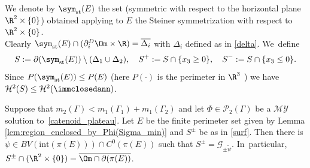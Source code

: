 We denote by $\sym_\mathrm{st}(E)$ the set (symmetric with respect to the horizontal plane $\R^2\times\{0\}$) obtained applying to $E$ the Steiner symmetrization with respect to $\R^2\times\{0\}$. \\
Clearly $\sym_\mathrm{st}(E)\cap(\partial_i^D\Om\times\R)=\overline{\Delta_i}$ with $\Delta_i$ defined as in \eqref{delta}. We~define
\begin{equation}\label{surf}
S:= \partial(\sym_\mathrm{st} (E))\setminus(\Delta_1\cup\Delta_2),\quad
S^+:= S\cap\{x_3\ge0\},\quad S^-:= S\cap\{x_3\le0\}.
\end{equation}
Since $P(\sym_\mathrm{st}(E))\le P(E)$ (here $P(\cdot)$ is the perimeter in $\R^3$ \cite{AFP}) we have $\mathcal{H}^2(S)\le\mathcal{H}^2(
\immclosedann)$.

\begin{lemma}
\label{lem:graphicality_of_boundary_and_continuity_up_to_the_boundary}
Suppose that $m_2(\Gamma)<m_1(\Gamma_1)+m_1(\Gamma_2)$ and let $\Phi\in\mathcal{P}_2(\Gamma)$ be a $\mathcal{MY}$ solution to~\eqref{catenoid_plateau}.
Let $E$ be the finite perimeter set given by Lemma \ref{lem:region_enclosed_by_Phi(Sigma_min)} and $S^\pm$ be as in \eqref{surf}.
Then there is $\widetilde \psi\in BV(\mathrm{int}(\pi(E)))\cap C^0(\pi(E))$ such that
$
S^\pm=
\mathcal {G}_{\pm\widetilde\psi}$.
In~particular, $S^\pm\cap(\R^2\times\{0\})=\overline{\Om\cap\partial(\pi(E))}$.
\end{lemma}

